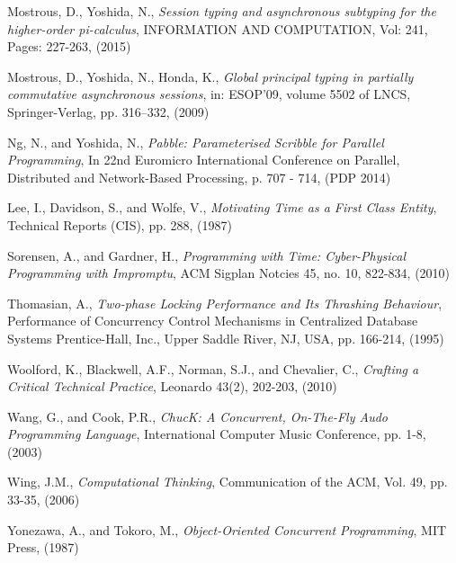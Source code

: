 \documentclass[11pt, abstracton, twoside, titlepage=true]{scrartcl}
\begin{document}
\begin{thebibliography}{9}
  Mostrous, D., Yoshida, N., 
  \emph{Session typing and asynchronous subtyping for the higher-order pi-calculus}, 
  INFORMATION AND COMPUTATION, Vol: 241, 
  Pages: 227-263,
  (2015)

  Mostrous, D., Yoshida, N., Honda, K., 
  \emph{Global principal typing in partially
  commutative asynchronous sessions},
  in: ESOP’09, volume 5502 of
  LNCS, 
  Springer-Verlag, 
  pp. 316–332,
  (2009)

  Ng, N., and Yoshida, N.,
  \emph{Pabble: Parameterised Scribble for Parallel Programming},
  In 22nd Euromicro International Conference on Parallel, Distributed and Network-Based Processing, 
  p. 707 - 714,
  (PDP 2014)

  Lee, I., Davidson, S., and Wolfe, V.,
  \emph{Motivating Time as a First Class Entity},
  Technical Reports (CIS),
  pp. 288,
  (1987)

  Sorensen, A., and Gardner, H.,
  \emph{Programming with Time: Cyber-Physical Programming with Impromptu},
  ACM Sigplan Notcies 45,
  no. 10, 822-834,
  (2010)

  Thomasian, A.,
  \emph{Two-phase Locking Performance and Its Thrashing Behaviour},
  Performance of Concurrency Control Mechanisms in Centralized Database Systems
  Prentice-Hall, Inc.,
  Upper Saddle River, NJ, USA,
  pp. 166-214,
  (1995)

  Woolford, K., Blackwell, A.F., Norman, S.J., and Chevalier, C.,
  \emph{Crafting a Critical Technical Practice},
  Leonardo 43(2),
  202-203,
  (2010)

  Wang, G., and Cook, P.R.,
  \emph{ChucK: A Concurrent, On-The-Fly Audo Programming Language},
  International Computer Music Conference,
  pp. 1-8,
  (2003)

  Wing, J.M.,
  \emph{Computational Thinking},
  Communication of the ACM,
  Vol. 49, pp. 33-35,
  (2006)

  Yonezawa, A., and Tokoro, M.,
  \emph{Object-Oriented Concurrent Programming},
  MIT Press,
  (1987)

\end{thebibliography}
\end{document}

